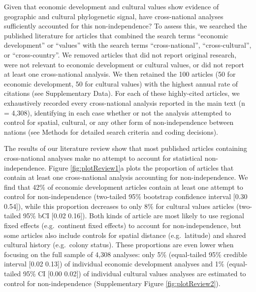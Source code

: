 \documentclass[
  man,floatsintext]{apa6}
\begin{document}
Given that economic development and cultural values show evidence of geographic and cultural phylogenetic signal, have cross-national analyses sufficiently accounted for this non-independence? To assess this, we searched the published literature for articles that combined the search terms ``economic development'' or ``values'' with the search terms ``cross-national'', ``cross-cultural'', or ``cross-country''. We removed articles that did not report original research, were not relevant to economic development or cultural values, or did not report at least one cross-national analysis. We then retained the 100 articles (50 for economic development, 50 for cultural values) with the highest annual rate of citations (see Supplementary Data). For each of these highly-cited articles, we exhaustively recorded every cross-national analysis reported in the main text (n = 4,308), identifying in each case whether or not the analysis attempted to control for spatial, cultural, or any other form of non-independence between nations (see Methods for detailed search criteria and coding decisions).

The results of our literature review show that most published articles containing cross-national analyses make no attempt to account for statistical non-independence. Figure \ref{fig:plotReview1}a plots the proportion of articles that contain at least one cross-national analysis accounting for non-independence. We find that 42\% of economic development articles contain at least one attempt to control for non-independence (two-tailed 95\% bootstrap confidence interval {[}0.30 0.54{]}), while this proportion decreases to only 8\% for cultural values articles (two-tailed 95\% bCI {[}0.02 0.16{]}). Both kinds of article are most likely to use regional fixed effects (e.g.~continent fixed effects) to account for non-independence, but some articles also include controls for spatial distance (e.g.~latitude) and shared cultural history (e.g.~colony status). These proportions are even lower when focusing on the full sample of 4,308 analyses: only 5\% (equal-tailed 95\% credible interval {[}0.02 0.13{]}) of individual economic development analyses and 1\% (equal-tailed 95\% CI {[}0.00 0.02{]}) of individual cultural values analyses are estimated to control for non-independence (Supplementary Figure \ref{fig:plotReview2}).
\end{document}
